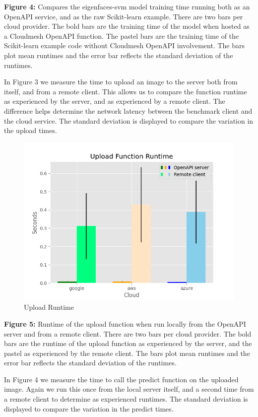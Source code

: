 \textbf{Figure 4:} Compares the eigenfaces-svm model training time
running both as an OpenAPI service, and as the raw Scikit-learn example.
There are two bars per cloud provider. The bold bars are the training
time of the model when hosted as a Cloudmesh OpenAPI function. The
pastel bars are the training time of the Scikit-learn example code
without Cloudmesh OpenAPI involvement. The bars plot mean runtimes and
the error bar reflects the standard deviation of the runtimes.

In Figure 3 we measure the time to upload an image to the server both
from itself, and from a remote client. This allows us to compare the
function runtime as experienced by the server, and as experienced by a
remote client. The difference helps determine the network latency
between the benchmark client and the cloud service. The standard
deviation is displayed to compare the variation in the upload times.

\begin{figure}
\centering
\includegraphics{../images/sample_graph_3.png}
\caption{Upload Runtime}
\end{figure}

\textbf{Figure 5:} Runtime of the upload function when run locally from
the OpenAPI server and from a remote client. There are two bars per
cloud provider. The bold bars are the runtime of the upload function as
experienced by the server, and the pastel as experienced by the remote
client. The bars plot mean runtimes and the error bar reflects the
standard deviation of the runtimes.

In Figure 4 we measure the time to call the predict function on the
uploaded image. Again we run this once from the local server itself, and
a second time from a remote client to determine as experienced runtimes.
The standard deviation is displayed to compare the variation in the
predict times.

